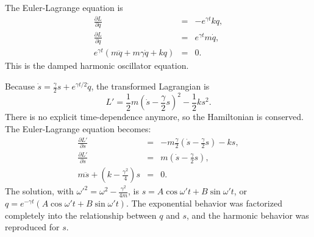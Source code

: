 \documentclass[letterpaper,11pt]{article}
\begin{document}
The Euler-Lagrange equation is
\begin{eqnarray*}
 \frac{\partial L}{\partial q} & = & - e^{\gamma t} k q, \\
 \frac{\partial L}{\partial \dot{q}} & = & e^{\gamma t} m \dot{q}, \\
 e^{\gamma t} (m \ddot{q} + m \gamma \dot{q} + k q) & = & 0.
\end{eqnarray*}
This is the damped harmonic oscillator equation.

Because $\dot{s} = \frac{\gamma}{2}s + e^{\gamma t/2} \dot{q}$, the transformed Lagrangian is
\begin{equation*}
 L' = \frac{1}{2}m (\dot{s} - \frac{\gamma}{2} s)^2 - \frac{1}{2}k s^2.
\end{equation*}
There is no explicit time-dependence anymore, so the Hamiltonian is conserved.  The Euler-Lagrange equation becomes:
\begin{eqnarray*}
 \frac{\partial L'}{\partial s} & = & - m \frac{\gamma}{2} (\dot{s} - \frac{\gamma}{2} s) - k s, \\
 \frac{\partial L'}{\partial \dot{s}} & = & m (\dot{s} - \frac{\gamma}{2} s), \\
 m \ddot{s} + (k - \frac{\gamma^2}{4}) s & = & 0.
\end{eqnarray*}
The solution, with $\omega'^2 = \omega^2 - \frac{\gamma^2}{4m}$, is $s = A \cos \omega' t + B \sin \omega' t$, or $q = e^{-\gamma t} (A \cos \omega' t + B \sin \omega' t)$.  The exponential behavior was factorized completely into the relationship between $q$ and $s$, and the harmonic behavior was reproduced for $s$.
\end{document}

